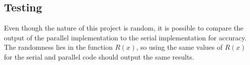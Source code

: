 \documentclass[12pt]{article}
\begin{document}
\subsection{Testing}
Even though the nature of this project is random, it is possible to
compare the output of the parallel implementation to the serial
implementation for accuracy. The randomness lies in the function
$R(x)$, so using the same values of $R(x)$ for the serial and parallel
code should output the same results.




\end{document}
